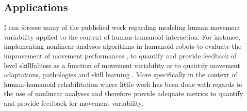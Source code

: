 \subsection*{Applications}
I can foresee many of the published work regarding modeling human movement 
variability applied to the context of human-humanoid interaction.
For instance, implementing nonlinear analyses algorithms in humanoid robots 
to evaluate the improvement of movement performances \citep{muller2004}, 
to quantify and provide feedback of level skillfulness as a function 
of movement variability \citep{seifert2011} or to quantify movement 
adaptations, pathologies and skill learning 
\citep{preatoni2007, preatoni2010, preatoni2013}.
More specifically in the context of human-humanoid rehabilitation 
where little work has been done \citep{gorer2013, guneysu2015}
with regards to the use of nonlinear analyses and therefore 
provide adequate metrics to quantify and provide feedback 
for movement variability. 



